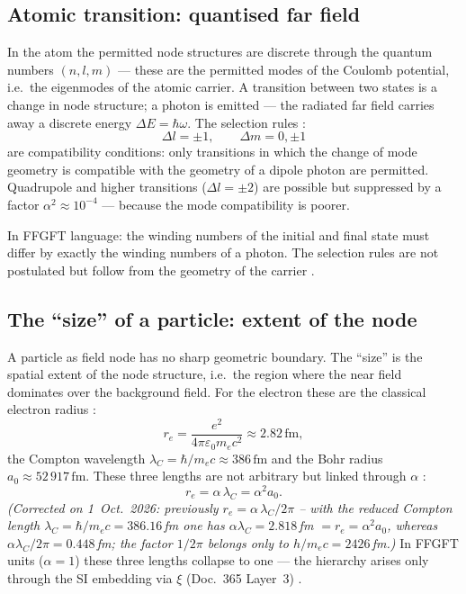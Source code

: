 \subsection*{Atomic transition: quantised far field}

In the atom the permitted node structures are discrete through the quantum
numbers $(n, l, m)$ --- these are the permitted modes of the Coulomb
potential, i.e.\ the eigenmodes of the atomic carrier. A transition between
two states is a change in node structure; a photon is emitted --- the
radiated far field carries away a discrete energy $\Delta E = \hbar\omega$.
The selection rules \cite{CohenTannoudji1977,Griffiths1995}:
\[
  \Delta l = \pm 1, \qquad \Delta m = 0,\pm 1
\]
are compatibility conditions: only transitions in which the change of mode
geometry is compatible with the geometry of a dipole photon are permitted.
Quadrupole and higher transitions ($\Delta l = \pm 2$) are possible but
suppressed by a factor $\alpha^2 \approx 10^{-4}$ --- because the mode
compatibility is poorer.

In FFGFT language: the winding numbers of the initial and final state must
differ by exactly the winding numbers of a photon. The selection rules are
not postulated but follow from the geometry of the carrier \SM.

\subsection*{The ``size'' of a particle: extent of the node}

A particle as field node has no sharp geometric boundary. The ``size'' is
the spatial extent of the node structure, i.e.\ the region where the near
field dominates over the background field. For the electron these are the
classical electron radius \EM:
\[
  r_e = \frac{e^2}{4\pi\varepsilon_0 m_e c^2} \approx 2.82\,\mathrm{fm},
\]
the Compton wavelength $\lambda_C = \hbar/m_e c \approx 386\,\mathrm{fm}$
and the Bohr radius $a_0 \approx 52\,917\,\mathrm{fm}$. These three lengths
are not arbitrary but linked through $\alpha$ \cite{Jackson1999,PascherDok365}:
\[
  r_e = \alpha\,\lambda_C = \alpha^2 a_0.
\]
\textit{(Corrected on 1~Oct.~2026: previously $r_e = \alpha\,\lambda_C/2\pi$ -- with the reduced Compton length $\lambda_C = \hbar/m_ec = 386.16$\,fm one has $\alpha\lambda_C = 2.818$\,fm $= r_e = \alpha^2a_0$, whereas $\alpha\lambda_C/2\pi = 0.448$\,fm; the factor $1/2\pi$ belongs only to $h/m_ec = 2426$\,fm.)}
In FFGFT units ($\alpha=1$) these three lengths collapse to one --- the
hierarchy arises only through the SI embedding via $\xi$ (Doc.~365
Layer~3) \KM.

